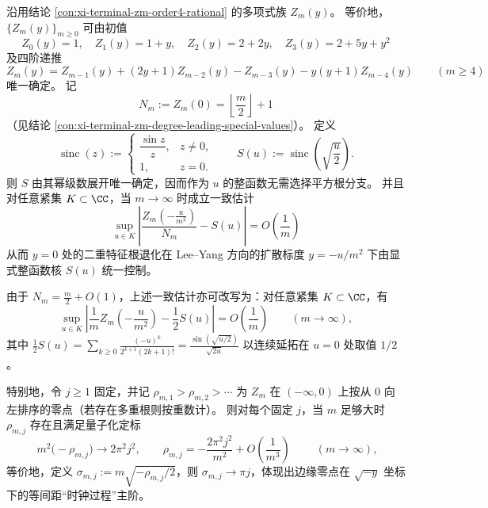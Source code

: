 
\begin{conclusion}[\texorpdfstring{$y=0$}{y=0} 的扩散 Lee--Yang 边缘：\texorpdfstring{$\operatorname{sinc}$}{sinc} 解析核与近零根量子化]\label{con:xi-terminal-zm-double-root-diffusive-sinc-limit}
沿用结论 \ref{con:xi-terminal-zm-order4-rational} 的多项式族 \(Z_m(y)\)。
等价地，\(\{Z_m(y)\}_{m\ge 0}\) 可由初值
\[
Z_0(y)=1,\quad
Z_1(y)=1+y,\quad
Z_2(y)=2+2y,\quad
Z_3(y)=2+5y+y^2
\]
及四阶递推
\[
Z_m(y)
=Z_{m-1}(y)+(2y+1)Z_{m-2}(y)-Z_{m-3}(y)-y(y+1)Z_{m-4}(y)
\qquad(m\ge 4)
\]
唯一确定。
记
\[
N_m:=Z_m(0)=\left\lfloor\frac m2\right\rfloor+1
\]
（见结论 \ref{con:xi-terminal-zm-degree-leading-special-values}）。
定义
\[
\operatorname{sinc}(z):=
\begin{cases}
\dfrac{\sin z}{z}, & z\neq 0,\\[1mm]
1, & z=0.
\end{cases}
\qquad
S(u):=\operatorname{sinc}\!\left(\sqrt{\frac{u}{2}}\right).
\]
则 \(S\) 由其幂级数展开唯一确定，因而作为 \(u\) 的整函数无需选择平方根分支。
并且对任意紧集 \(K\subset\CC\)，当 \(m\to\infty\) 时成立一致估计
\[
\boxed{\;
\sup_{u\in K}\left\lvert
\frac{Z_m\!\left(-\frac{u}{m^{2}}\right)}{N_m}-S(u)
\right\rvert=O\!\left(\frac1m\right)\;}
\]
从而 \(y=0\) 处的二重特征根退化在 Lee--Yang 方向的扩散标度 \(y=-u/m^2\) 下由显式整函数核 \(S(u)\) 统一控制。
\par
由于 \(N_m=\frac m2+O(1)\)，上述一致估计亦可改写为：对任意紧集 \(K\subset\CC\)，有
\[
\sup_{u\in K}\left\lvert
\frac{1}{m}Z_m\!\left(-\frac{u}{m^{2}}\right)-\frac12 S(u)
\right\rvert=O\!\left(\frac1m\right)
\qquad(m\to\infty),
\]
其中
\(
\frac12 S(u)=\sum_{k\ge 0}\frac{(-u)^k}{2^{k+1}(2k+1)!}
=\frac{\sin(\sqrt{u/2})}{\sqrt{2u}}
\)
以连续延拓在 \(u=0\) 处取值 \(1/2\)。

特别地，令 \(j\ge 1\) 固定，并记 \(\rho_{m,1}>\rho_{m,2}>\cdots\) 为 \(Z_m\) 在 \((-\infty,0)\) 上按从 \(0\) 向左排序的零点（若存在多重根则按重数计）。
则对每个固定 \(j\)，当 \(m\) 足够大时 \(\rho_{m,j}\) 存在且满足量子化定标
\[
\boxed{\;
m^{2}\bigl(-\rho_{m,j}\bigr)\longrightarrow 2\pi^{2}j^{2},
\qquad
\rho_{m,j}=-\frac{2\pi^{2}j^{2}}{m^{2}}+O\!\left(\frac1{m^{3}}\right)\;}
\qquad(m\to\infty),
\]
等价地，定义 \(\sigma_{m,j}:=m\sqrt{-\rho_{m,j}/2}\)，则 \(\sigma_{m,j}\to \pi j\)，体现出边缘零点在 \(\sqrt{-y}\) 坐标下的等间距“时钟过程”主阶。
\end{conclusion}
